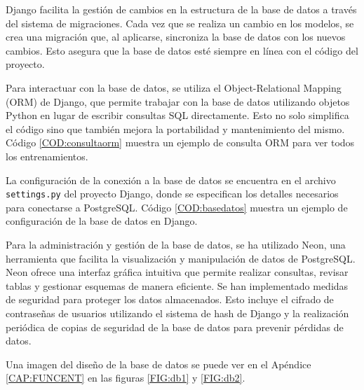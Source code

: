 Django facilita la gestión de cambios en la estructura de la base de datos a través del sistema de migraciones. Cada vez que se realiza un cambio en los modelos, se crea una migración que, al aplicarse, sincroniza la base de datos con los nuevos cambios. Esto asegura que la base de datos esté siempre en línea con el código del proyecto.

Para interactuar con la base de datos, se utiliza el Object-Relational Mapping (ORM) de Django, que permite trabajar con la base de datos utilizando objetos Python en lugar de escribir consultas SQL directamente. Esto no solo simplifica el código sino que también mejora la portabilidad y mantenimiento del mismo. Código \ref{COD:consultaorm} muestra un ejemplo de consulta ORM para ver todos los entrenamientos.

La configuración de la conexión a la base de datos se encuentra en el archivo \texttt{settings.py} del proyecto Django, donde se especifican los detalles necesarios para conectarse a PostgreSQL. Código \ref{COD:basedatos} muestra un ejemplo de configuración de la base de datos en Django.

Para la administración y gestión de la base de datos, se ha utilizado Neon, una herramienta que facilita la visualización y manipulación de datos de PostgreSQL. Neon ofrece una interfaz gráfica intuitiva que permite realizar consultas, revisar tablas y gestionar esquemas de manera eficiente.
Se han implementado medidas de seguridad para proteger los datos almacenados. Esto incluye el cifrado de contraseñas de usuarios utilizando el sistema de hash de Django y la realización periódica de copias de seguridad de la base de datos para prevenir pérdidas de datos.

Una imagen del diseño de la base de datos se puede ver en el Apéndice \ref{CAP:FUNCENT} en las figuras \ref{FIG:db1} y \ref{FIG:db2}.
